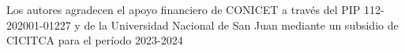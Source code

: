 \documentclass[baaa]{baaa}
\begin{document}




\begin{acknowledgement}

Los autores agradecen el apoyo financiero de CONICET a través del PIP 112-202001-01227 y de la Universidad Nacional de San Juan mediante un subsidio de CICITCA para el período 2023-2024

\end{acknowledgement}


\small

\end{document}
